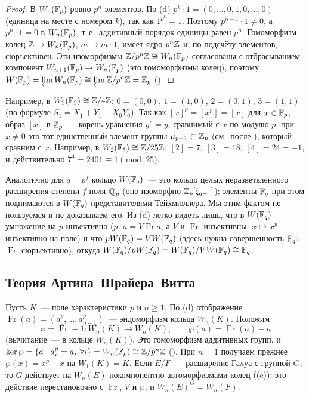 \begin{proof}
В $W_n(\mathbb F_p)$ ровно $p^n$ элементов. По (d) $p^k\cdot1=(0,\dots,0,1,0,\dots,0)$ (единица на месте с номером $k$), так
как $1^{p^k}=1$. Поэтому $p^{n-1}\cdot1\ne0$, а $p^n\cdot1=0$ в $W_n(\mathbb F_p)$, т.\,е.\ аддитивный порядок единицы равен $p^n$.
Гомоморфизм колец $\mathbb Z\to W_n(\mathbb F_p)$, $m\mapsto m\cdot1$, имеет ядро $p^n\mathbb Z$ и, по подсчёту элементов, сюръективен. Эти
изоморфизмы $\mathbb Z/p^n\mathbb Z\cong W_n(\mathbb F_p)$ согласованы с отбрасыванием компонент $W_{n+1}(\mathbb F_p)\to W_n(\mathbb F_p)$ (это гомоморфизмы
колец), поэтому $W(\mathbb F_p)=\varprojlim W_n(\mathbb F_p)\cong\varprojlim\mathbb Z/p^n\mathbb Z=\mathbb Z_p$ ().
\end{proof}

Например, в $W_2(\mathbb F_2)\cong\mathbb Z/4\mathbb Z$: $0=(0,0)$, $1=(1,0)$, $2=(0,1)$, $3=(1,1)$ (по формуле $S_1=X_1+Y_1-X_0Y_0$). Так как
$[x]^p=[x^p]=[x]$ для $x\in\mathbb F_p$, образ $[x]$ в $\mathbb Z_p$~--- корень уравнения $y^p=y$, сравнимый с $x$ по модулю $p$; при
$x\ne0$ это тот единственный элемент группы $\mu_{p-1}\subset\mathbb Z_p$ (см.\ после ), который сравним с $x$. Например, в
$W_2(\mathbb F_5)\cong\mathbb Z/25\mathbb Z$: $[2]=7$, $[3]=18$, $[4]=24=-1$, и действительно $7^4=2401\equiv1\pmod{25}$.

\begin{aside}[5.32q]
Аналогично для $q=p^f$ кольцо $W(\mathbb F_q)$~--- это кольцо целых неразветвлённого расширения степени $f$ поля $\mathbb Q_p$ (оно
изоморфно $\mathbb Z_p[\zeta_{q-1}]$); элементы $\mathbb F_q$ при этом поднимаются в $W(\mathbb F_q)$ представителями Тейхмюллера. Мы этим
фактом не пользуемся и не доказываем его. Из (d) легко видеть лишь, что в $W(\mathbb F_q)$ умножение на $p$ инъективно
($p\cdot a=V\operatorname{Fr}a$, а $V$ и $\operatorname{Fr}$ инъективны: $x\mapsto x^p$ инъективно на поле) и что
$pW(\mathbb F_q)=VW(\mathbb F_q)$ (здесь нужна совершенность $\mathbb F_q$: $\operatorname{Fr}$ сюръективно), откуда
$W(\mathbb F_q)/pW(\mathbb F_q)=W(\mathbb F_q)/VW(\mathbb F_q)\cong\mathbb F_q$.
\end{aside}

\subsection*{Теория Артина--Шрайера--Витта}

Пусть $K$~--- поле характеристики $p$ и $n\ge1$. По (d) отображение $\operatorname{Fr}(a)=(a_0^p,\dots,a_{n-1}^p)$~---
эндоморфизм кольца $W_n(K)$. Положим
\[
\wp=\operatorname{Fr}-1\colon W_n(K)\to W_n(K),\qquad\wp(a)=\operatorname{Fr}(a)-a
\]
(вычитание~--- в кольце $W_n(K)$). Это гомоморфизм аддитивных групп, и $\ker\wp=\{a\mid a_i^p=a_i\ \forall i\}=W_n(\mathbb F_p)\cong\mathbb Z/p^n\mathbb Z$
(). При $n=1$ получаем прежнее $\wp(x)=x^p-x$ на $W_1(K)=K$. Если $E/F$~--- расширение Галуа с группой $G$, то $G$
действует на $W_n(E)$ покомпонентно автоморфизмами колец ((c)); это действие перестановочно с $\operatorname{Fr}$, $V$
и $\wp$, и $W_n(E)^G=W_n(F)$.

